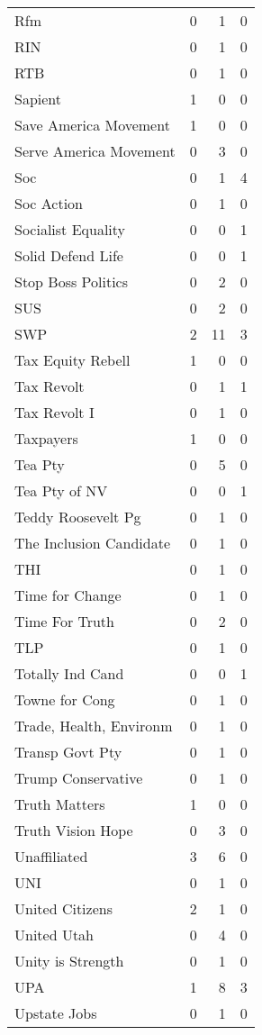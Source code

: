 \begin{supertabular}{lrrr}
Rfm & 0 & 1 & 0\\
RIN & 0 & 1 & 0\\
RTB & 0 & 1 & 0\\
Sapient & 1 & 0 & 0\\
Save America Movement & 1 & 0 & 0\\
Serve America Movement & 0 & 3 & 0\\
Soc & 0 & 1 & 4\\
Soc Action & 0 & 1 & 0\\
Socialist Equality & 0 & 0 & 1\\
Solid Defend Life & 0 & 0 & 1\\
Stop Boss Politics & 0 & 2 & 0\\
SUS & 0 & 2 & 0\\
SWP & 2 & 11 & 3\\
Tax Equity Rebell & 1 & 0 & 0\\
Tax Revolt & 0 & 1 & 1\\
Tax Revolt I & 0 & 1 & 0\\
Taxpayers & 1 & 0 & 0\\
Tea Pty & 0 & 5 & 0\\
Tea Pty of NV & 0 & 0 & 1\\
Teddy Roosevelt Pg & 0 & 1 & 0\\
The Inclusion Candidate & 0 & 1 & 0\\
THI & 0 & 1 & 0\\
Time for Change & 0 & 1 & 0\\
Time For Truth & 0 & 2 & 0\\
TLP & 0 & 1 & 0\\
Totally Ind Cand & 0 & 0 & 1\\
Towne for Cong & 0 & 1 & 0\\
Trade, Health, Environm & 0 & 1 & 0\\
Transp Govt Pty & 0 & 1 & 0\\
Trump Conservative & 0 & 1 & 0\\
Truth Matters & 1 & 0 & 0\\
Truth Vision Hope & 0 & 3 & 0\\
Unaffiliated & 3 & 6 & 0\\
UNI & 0 & 1 & 0\\
United Citizens & 2 & 1 & 0\\
United Utah & 0 & 4 & 0\\
Unity is Strength & 0 & 1 & 0\\
UPA & 1 & 8 & 3\\
Upstate Jobs & 0 & 1 & 0\\

\end{supertabular}
